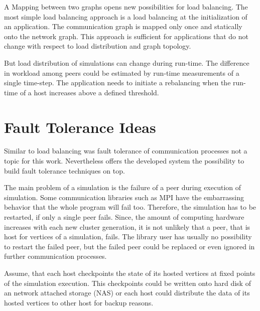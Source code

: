 \noindent A Mapping between two graphs opens new possibilities for
load balancing.  The most simple load balancing approach is a load
balancing at the initialization of an application. The communication
graph is mapped only once and statically onto the network graph. This
approach is sufficient for applications that do not change with
respect to load distribution and graph topology.

But load distribution of simulations can change during run-time. The
difference in workload among peers could be estimated by run-time
measurements of a single time-step. The application needs to initiate
a rebalancing when the run-time of a host increases above a defined
threshold.

\section*{Fault Tolerance Ideas}

Similar to load balancing was fault tolerance of communication
processes not a topic for this work. Nevertheless offers the developed
system the possibility to build fault tolerance techniques on top.

The main problem of a simulation is the failure of a peer during
execution of simulation.  Some communication libraries such as MPI
have the embarrassing behavior that the whole program will fail
too. Therefore, the simulation has to be restarted, if only a single
peer fails.  Since, the amount of computing hardware increases with
each new cluster generation, it is not unlikely that a peer, that is
host for vertices of a simulation, fails. The library user has usually
no possibility to restart the failed peer, but the failed peer could
be replaced or even ignored in further communication processes.

Assume, that each host checkpoints the state of its hosted
vertices at fixed points of the simulation execution. This
checkpoints could be written onto hard disk of an network attached
storage (NAS) or each host could distribute the data of its hosted
vertices to other host for backup reasons.

